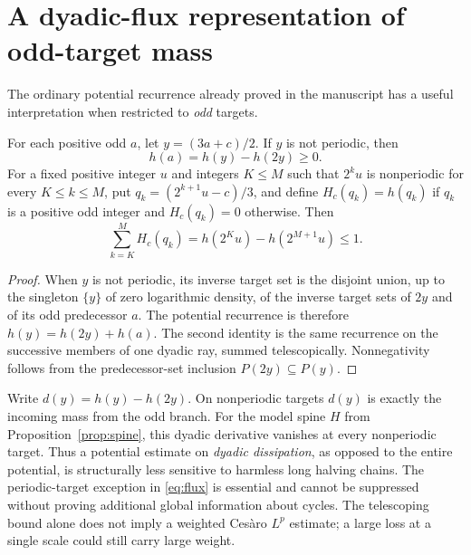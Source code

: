 \section{A dyadic-flux representation of odd-target mass}
The ordinary potential recurrence already proved in the manuscript has a
useful interpretation when restricted to \emph{odd} targets.
\begin{proposition}\label{prop:flux}
For each positive odd $a$, let $y=(3a+c)/2$.  If $y$ is not
periodic, then
\begin{equation}\label{eq:flux}
 \boxed{h(a)=h(y)-h(2y)\ge0.}
\end{equation}
For a fixed positive integer $u$ and integers $K\le M$ such that
$2^ku$ is nonperiodic for every $K\le k\le M$, put $q_k=(2^{k+1}u-c)/3$, and define $H_c(q_k)=h(q_k)$
if $q_k$ is a positive odd integer and $H_c(q_k)=0$ otherwise.  Then
\begin{equation}\label{eq:telescoping}
 \boxed{\sum_{k=K}^{M} H_c(q_k)
       =h(2^Ku)-h(2^{M+1}u)\le1.}
\end{equation}
\end{proposition}
\begin{proof}
When $y$ is not periodic, its inverse target set is the disjoint
union, up to the singleton $\{y\}$ of zero logarithmic density,
of the inverse target sets of $2y$ and of its odd predecessor $a$.
The potential recurrence is therefore $h(y)=h(2y)+h(a)$.
The second identity is the same recurrence on the successive
members of one dyadic ray, summed telescopically.  Nonnegativity
follows from the predecessor-set inclusion $P(2y)\subseteq P(y)$.
\end{proof}
\begin{remark}
Write $d(y)=h(y)-h(2y)$.  On nonperiodic targets $d(y)$ is exactly
the incoming mass from the odd branch.  For the model spine
$H$ from Proposition~\ref{prop:spine}, this dyadic derivative
vanishes at every nonperiodic target.  Thus a potential estimate
on \emph{dyadic dissipation}, as opposed to the entire potential,
is structurally less sensitive to harmless long halving chains.
The periodic-target exception in \eqref{eq:flux} is essential and
cannot be suppressed without proving additional global information
about cycles.  The telescoping bound alone does not imply a
weighted Ces\`aro $L^p$ estimate; a large loss at a single scale
could still carry large weight.
\end{remark}

